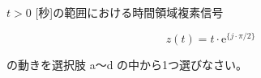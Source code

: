 $t > 0$ [秒]の範囲における時間領域複素信号 

\[
z(t) = t \cdot \textrm{e}^{\{j \cdot \pi/2 \}}
\]

\medskip
\noindent の動きを選択肢 a〜d の中から1つ選びなさい。
